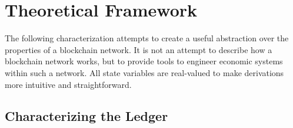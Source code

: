 \documentclass[letterpaper, 10 pt, conference]{ieeeconf}  %
\newtheorem{definition}{Definition}
\begin{document}

\section{Theoretical Framework} \label{sec:Notation}
The following characterization attempts to create a useful abstraction over the properties of a blockchain network. It is not an attempt to describe how a blockchain network works, but to provide tools to engineer economic systems within such a network. All state variables are real-valued to make derivations more intuitive and straightforward.


\subsection{Characterizing the Ledger}

\end{document}
